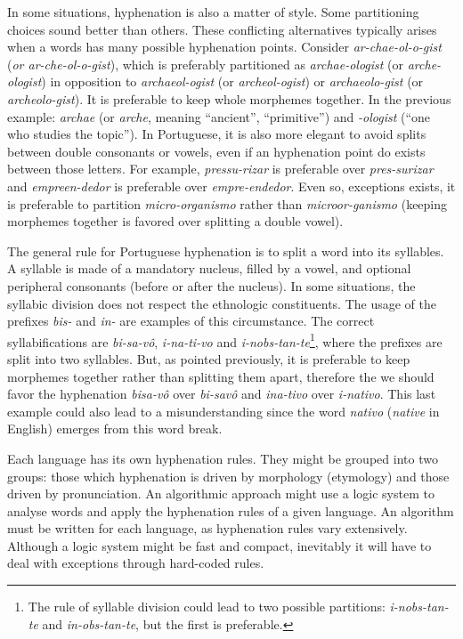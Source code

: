 \documentclass{article}
\begin{document}
In some situations, hyphenation is also a matter of style. Some partitioning
choices sound better than others. These conflicting alternatives typically
arises when a words has many possible hyphenation points. Consider
\emph{ar-chae-ol-o-gist} (\emph{or ar-che-ol-o-gist}), which is preferably partitioned as
\emph{archae-ologist} (or \emph{arche-ologist}) in opposition to \emph{archaeol-ogist} (or
\emph{archeol-ogist}) or \emph{archaeolo-gist} (or \emph{archeolo-gist}). It is preferable to keep
whole morphemes together. In the previous example: \emph{archae} (or \emph{arche}, meaning
``ancient'', ``primitive'')
and \emph{-ologist} (``one who studies the topic''). In Portuguese, it is also more
elegant to avoid splits between double consonants or vowels, even if an
hyphenation point do exists between those letters. For example,
\emph{pressu-rizar} is preferable over \emph{pres-surizar} and
\emph{empreen-dedor} is preferable over \emph{empre-endedor}. Even so,
exceptions exists, it is preferable to partition \emph{micro-organismo}
rather than \emph{microor-ganismo} (keeping morphemes together is favored
over splitting a double vowel).

The general rule for Portuguese hyphenation is to split a word into its
syllables. A syllable is made of a mandatory nucleus, filled by a vowel, and
optional peripheral consonants (before or after the nucleus). In some
situations, the syllabic division does not respect the ethnologic constituents.
The usage of the prefixes \emph{bis-} and \emph{in-} are examples of this
circumstance. The correct syllabifications are \emph{bi-sa-vô},
\emph{i-na-ti-vo} and \emph{i-nobs-tan-te}\footnote{The rule of syllable
division could lead to two possible partitions: \emph{i-nobs-tan-te} and
\emph{in-obs-tan-te}, but the first is preferable.}, where the prefixes are
split into two syllables. But, as pointed previously, it is preferable to keep
morphemes together rather than splitting them apart, therefore the we should
favor the hyphenation \emph{bisa-vô} over \emph{bi-savô} and \emph{ina-tivo}
over \emph{i-nativo}. This last example could also lead to a misunderstanding
since the word \emph{nativo} (\emph{native} in English) emerges from this word
break. 

Each language has its own hyphenation rules. They might be grouped into two
groups: those which hyphenation is driven by morphology (etymology) and those
driven by pronunciation. An algorithmic approach might use a logic system to
analyse words and apply the hyphenation rules of a given language. An algorithm
must be written for each language, as hyphenation rules vary extensively.
Although a logic system might be fast and compact, inevitably it will have to
deal with exceptions through hard-coded rules.
\end{document}
